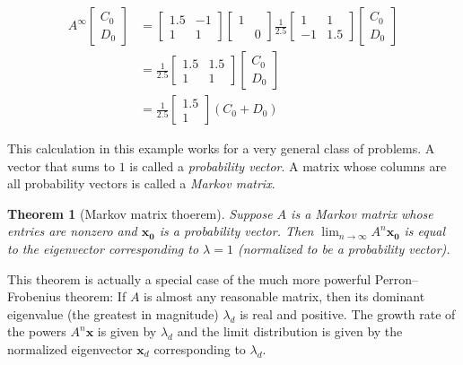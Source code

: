 \documentclass[11pt,oneside]{amsbook}
\theoremstyle{definition}
\theoremstyle{plain}
\newtheorem{theorem}{Theorem}[section]
\theoremstyle{definition}
\theoremstyle{remark}
\numberwithin{equation}{section}
\numberwithin{figure}{section}
\begin{document}
\begin{align*}
  A^\infty\begin{bmatrix}C_0\\D_0\end{bmatrix}
  &=\begin{bmatrix}1.5&-1\\1&1\end{bmatrix}
    \begin{bmatrix}1\\&0\end{bmatrix}
    \frac{1}{2.5}
    \begin{bmatrix}1&1\\-1&1.5\end{bmatrix}
    \begin{bmatrix}C_0\\D_0\end{bmatrix}\\
  &=\frac{1}{2.5}\begin{bmatrix}1.5&1.5\\1&1\end{bmatrix}
     \begin{bmatrix}C_0\\D_0\end{bmatrix}\\
  &=\frac{1}{2.5}\begin{bmatrix}1.5\\1\end{bmatrix}
   (C_0+D_0)
\end{align*}

This calculation in this example works for a very general class of problems. A vector that sums to $1$ is called a \emph{probability vector}. A matrix whose columns are all probability vectors is called a \emph{Markov matrix}.

\begin{theorem}[Markov matrix thoerem]
  Suppose $A$ is a Markov matrix whose entries are nonzero and $\mathbf{x_0}$ is a probability vector. Then $\lim_{n\to\infty}A^n\mathbf{x_0}$ is equal to the eigenvector corresponding to $\lambda=1$ (normalized to be a probability vector).
\end{theorem}

This theorem is actually a special case of the much more powerful Perron--Frobenius theorem: If $A$ is almost any reasonable matrix, then its dominant eigenvalue (the greatest in magnitude) $\lambda_d$ is real and positive. The growth rate of the powers $A^n\mathbf{x}$ is given by $\lambda_d$ and the limit distribution is given by the normalized eigenvector $\mathbf{x}_d$ corresponding to $\lambda_d$.
\end{document}
